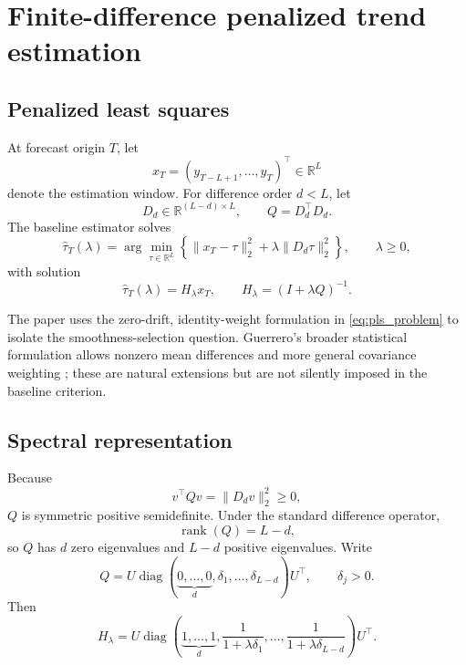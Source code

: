 \section{Finite-difference penalized trend estimation}

\subsection{Penalized least squares}

At forecast origin $T$, let
\begin{equation}
\label{eq:observation_window}
x_T=(y_{T-L+1},\ldots,y_T)^\top\in\mathbb{R}^{L}
\end{equation}
denote the estimation window. For difference order $d<L$, let
\begin{equation}
\label{eq:penalty_gram_matrix}
D_d\in\mathbb{R}^{(L-d)\times L},
\qquad
Q=D_d^\top D_d.
\end{equation}
The baseline estimator solves
\begin{equation}
\label{eq:pls_problem}
\widehat\tau_T(\lambda)
=
\arg\min_{\tau\in\mathbb{R}^{L}}
\left\{
\|x_T-\tau\|_2^2+\lambda\|D_d\tau\|_2^2
\right\},
\qquad \lambda\ge0,
\end{equation}
with solution
\begin{equation}
\label{eq:H}
\widehat\tau_T(\lambda)
=
H_\lambda x_T,
\qquad
H_\lambda=(I+\lambda Q)^{-1}.
\end{equation}

The paper uses the zero-drift, identity-weight formulation in \cref{eq:pls_problem} to isolate the smoothness-selection question. Guerrero's broader statistical formulation allows nonzero mean differences and more general covariance weighting \cite{guerrero2007penalized}; these are natural extensions but are not silently imposed in the baseline criterion.

\subsection{Spectral representation}

Because
\begin{equation}
\label{eq:penalty_positive_semidefinite}
v^\top Qv=\|D_dv\|_2^2\ge0,
\end{equation}
$Q$ is symmetric positive semidefinite. Under the standard difference operator,
\begin{equation}
\label{eq:penalty_rank}
\operatorname{rank}(Q)=L-d,
\end{equation}
so $Q$ has $d$ zero eigenvalues and $L-d$ positive eigenvalues. Write
\begin{equation}
\label{eq:penalty_spectral_decomposition}
Q=
U\operatorname{diag}
\left(
\underbrace{0,\ldots,0}_{d},
\delta_1,\ldots,\delta_{L-d}
\right)U^\top,
\qquad
\delta_j>0.
\end{equation}
Then
\begin{equation}
\label{eq:H_spectral}
H_\lambda
=
U\operatorname{diag}
\left(
\underbrace{1,\ldots,1}_{d},
\frac{1}{1+\lambda\delta_1},
\ldots,
\frac{1}{1+\lambda\delta_{L-d}}
\right)U^\top.
\end{equation}

